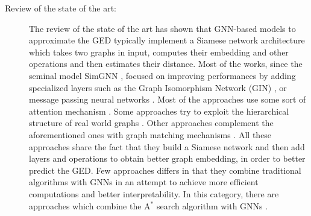 \documentclass[../Thesis.tex]{subfiles}
\begin{document}
    \begin{description}
        \item[Review of the state of the art:] The review of the state of the art has shown that GNN-based models to approximate the GED typically implement a Siamese network architecture which takes two graphs in input, computes their embedding and other operations and then estimates their distance. Most of the works, since the seminal model SimGNN \cite{simgnn__a_neural_network_approach_to_fast_graph_similarity_computation}, focused on improving performances by adding specialized layers such as the Graph Isomorphism Network (GIN) \cite{noah__neural_optimized_a*_search_algorithm_for_graph_edit_distance_computation}, or message passing neural networks \cite{learning_graph_edit_distance_by_graph_neural_networks}. Most of the approaches use some sort of attention mechanism \cite{simgnn__a_neural_network_approach_to_fast_graph_similarity_computation, noah__neural_optimized_a*_search_algorithm_for_graph_edit_distance_computation, exploring_attention_mechanism_for_graph_similarity_learning, graph_edit_distance_learning_via_different_attention, graph_graph_context_dependency_attention_for_graph_edit_distance}. Some approaches try to exploit the hierarchical structure of real world graphs \cite{graph_partitioning_and_graph_neural_network_based_hierarchical_graph_matching_for_graph_similarity_computation, h2mn__graph_similarity_learning_with_hierarchical_hypergraph_matching_networks, multilevel_graph_matching_networks_for_deep_graph_similarity_learning}. Other approaches complement the aforementioned ones with graph matching mechanisms \cite{more_interpretable_graph_similarity_computation_via_maximum_common_subgraph_inference, multilevel_graph_matching_networks_for_deep_graph_similarity_learning, h2mn__graph_similarity_learning_with_hierarchical_hypergraph_matching_networks, computing_graph_edit_distance_via_neural_graph_matching}. All these approaches share the fact that they build a Siamese network and then add layers and operations to obtain better graph embedding, in order to better predict the GED.
        Few approaches differs in that they combine traditional algorithms with GNNs in an attempt to achieve more efficient computations and better interpretability. In this category, there are approaches which combine the A$^*$ search algorithm with GNNs \cite{combinatorial_learning_of_graph_edit_distance_via_dynamic_embedding, noah__neural_optimized_a*_search_algorithm_for_graph_edit_distance_computation, mata_combining_learnable_node_matching_with_a*_algorithm_for_approximate_graph_edit_distance}.

\end{description}
\end{document}
